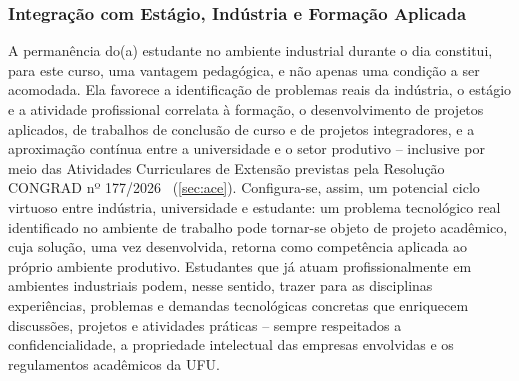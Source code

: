 \subsubsection{Integração com Estágio, Indústria e Formação Aplicada}

A permanência do(a) estudante no ambiente industrial durante o dia constitui, para este curso, uma vantagem pedagógica, e não apenas uma condição a ser acomodada. Ela favorece a identificação de problemas reais da indústria, o estágio e a atividade profissional correlata à formação, o desenvolvimento de projetos aplicados, de trabalhos de conclusão de curso e de projetos integradores, e a aproximação contínua entre a universidade e o setor produtivo -- inclusive por meio das Atividades Curriculares de Extensão previstas pela Resolução CONGRAD nº 177/2026~\cite{ufu_congrad_177_2026} (\autoref{sec:ace}). Configura-se, assim, um potencial ciclo virtuoso entre indústria, universidade e estudante: um problema tecnológico real identificado no ambiente de trabalho pode tornar-se objeto de projeto acadêmico, cuja solução, uma vez desenvolvida, retorna como competência aplicada ao próprio ambiente produtivo. Estudantes que já atuam profissionalmente em ambientes industriais podem, nesse sentido, trazer para as disciplinas experiências, problemas e demandas tecnológicas concretas que enriquecem discussões, projetos e atividades práticas -- sempre respeitados a confidencialidade, a propriedade intelectual das empresas envolvidas e os regulamentos acadêmicos da UFU.

